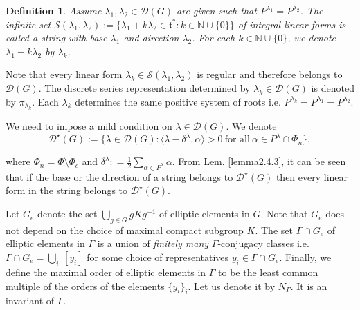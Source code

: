 \documentclass[11 pt]{amsart}
\newcommand{\N}{{\mathbb N}}
\theoremstyle{definition}
\newtheorem{definition}[theorem]{Definition}
\numberwithin{equation}{section}
\begin{document}
 \begin{definition}
\textit{Assume $\lambda_1, \lambda_2 \in \mathcal{D}(G)$ are given such that $P^{\lambda_1}=P^{\lambda_2}$. The infinite set $\mathcal{S}(\lambda_1, \lambda_2):= \{ \lambda_1 + k \lambda_2 \in \mathfrak{t}^* : k \in \N \cup \{0\} \}$ of integral linear forms is called a string with base $\lambda_1$ and direction $\lambda_2$. For each $k \in \N \cup \{0\}$, we denote $\lambda_1 +k \lambda_2$ by $\lambda_k$.} 
 \end{definition}
\noindent Note that every linear form $\lambda_k \in \mathcal{S}(\lambda_1, \lambda_2)$ is regular and therefore belongs to $\mathcal{D}(G)$. The discrete series representation determined by $\lambda_k \in \mathcal{D}(G)$ is denoted by $\pi_{\lambda_k}$. Each $\lambda_k$ determines the same positive system of roots i.e. $P^{\lambda_k}=P^{\lambda_1}=P^{\lambda_2}$. 

\vspace{5pt}

We need to impose a mild condition on $\lambda \in \mathcal{D}(G)$. We denote $$\mathcal{D}^{\star}(G) := \{ \lambda \in \mathcal{D}(G) : \langle \lambda-\delta^{\lambda} , \alpha \rangle > 0\ \text{for all}\ \alpha \in P^{\lambda} \cap \Phi_n\},$$

\noindent where $\Phi_n = \Phi \setminus \Phi_c$ and $\delta^{\lambda} : = \frac{1}{2} \sum\limits_{\alpha \in P^{\lambda}} \alpha $. From Lem. \ref{lemma2.4.3}, it can be seen that if the base or the direction of a string belongs to $\mathcal{D}^{\star}(G)$ then every linear form in the string belongs to $\mathcal{D}^{\star}(G)$.

\hspace{5pt}

 Let $G_e$ denote the set $\bigcup\limits_{g \in G} g K g^{-1}$ of elliptic elements in $G$. Note that $G_e$ does not depend on the choice of maximal compact subgroup $K$. The set $\Gamma \cap G_e$ of elliptic elements in $\Gamma$ is a union of \textit{finitely many} $\Gamma$-conjugacy classes i.e. $\Gamma \cap G_e = \bigcup\limits_i \ [y_i]$ for some choice of representatives $y_i \in \Gamma \cap G_e$. Finally, we define the maximal order of elliptic elements in $\Gamma$ to be the least common multiple of the orders of the elements $\{y_i \}_i$. Let us denote it by $N_{\Gamma}$. It is an invariant of $\Gamma$.

 \vspace{10pt}
\end{document}

